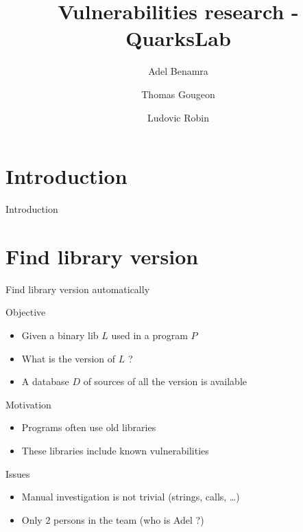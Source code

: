 \documentclass[11pt]{beamer}
\author{Adel Benamra \and Thomas Gougeon \and Ludovic Robin}
\title{Vulnerabilities research - QuarksLab}
\begin{document}
\begin{frame}
\titlepage
\end{frame}

\begin{frame}
\tableofcontents
\end{frame}

\section{Introduction}
\begin{frame}{Introduction}

\end{frame}

\section{Find library version}
\begin{frame}{Find library version automatically}

\begin{block}{Objective}
	\begin{itemize}
		\item Given a binary lib $L$ used in a program $P$
		\item What is the version of $L$ ?
		\item A database $D$ of sources of all the version is available
	\end{itemize}
\end{block}

\begin{block}{Motivation}
	\begin{itemize}
		\item Programs often use old libraries
		\item These libraries include known vulnerabilities
	\end{itemize}
\end{block}

\begin{block}{Issues}
	\begin{itemize}
		\item Manual investigation is not trivial (strings, calls, \dots)
		\item Only $2$ persons in the team (who is Adel ?)
	\end{itemize}

\end{block}

\end{frame}
\end{document}
